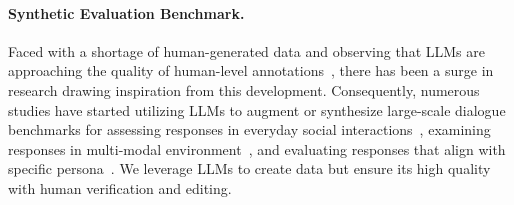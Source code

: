 \paragraph{Synthetic Evaluation Benchmark.}
Faced with a shortage of human-generated data and observing that LLMs are approaching the quality of human-level annotations~\cite{he2023annollm, lee-etal-2023-making}, there has been a surge in research drawing inspiration from this development. 
Consequently, numerous studies have started utilizing LLMs to augment or synthesize large-scale dialogue benchmarks for assessing responses in everyday social interactions~\cite{kim-etal-2023-soda}, examining responses in multi-modal environment~\cite{feng2023mmdialog}, and evaluating responses that align with specific persona~\cite{jandaghi2023faithful}. We leverage LLMs to create data but ensure its high quality with human verification and editing.
